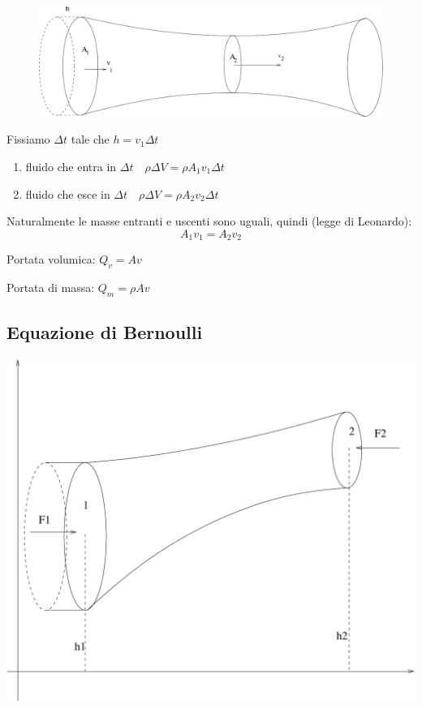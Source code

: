 \begin{figure}[htbp]
\centering
\includegraphics[scale=0.4]{immagini/fisica1/equazione_continuita}
\end{figure}
Fissiamo $\Delta t$ tale che $h=v_1\Delta t$
\begin{enumerate}
\item fluido che entra in $\Delta t\quad \rho\Delta V=\rho A_1v_1\Delta t$
\item fluido che esce in $\Delta t\quad \rho\Delta V=\rho A_2v_2\Delta t$
\end{enumerate}
Naturalmente le masse entranti e uscenti sono uguali, quindi (legge di Leonardo):
\[A_1v_1=A_2v_2\]

Portata volumica: $Q_v=Av$

Portata di massa: $Q_m=\rho Av$

\subsection{Equazione di Bernoulli}


\begin{center}
\includegraphics[scale=0.4]{immagini/fisica1/Bernoulli}
\end{center}


